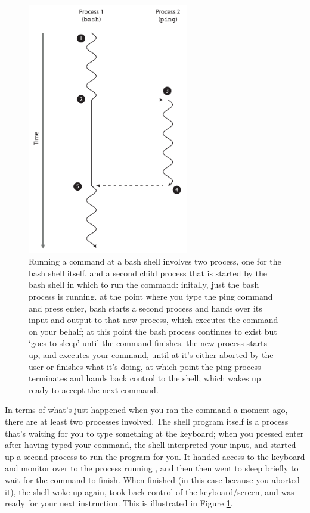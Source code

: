 \begin{figure}
\centerline{\includegraphics[width=7cm]{images/bashandping}}
\caption{Running a command at a bash shell involves two process, one for the bash shell itself, and a second child process that is started by the bash shell in which to run the command: \protect{} initally, just the bash process is running. \protect{} at the point where you type the ping command and press enter, bash starts a second process and hands over its input and output to that new process, which executes the command on your behalf; at this point the bash process continues to exist but `goes to sleep' until the command finishes. \protect{} the new process starts up, and executes your command, until at \protect{} it's either aborted by the user or finishes what it's doing, at which point \protect{} the ping process terminates and hands back control to the shell, which wakes up ready to accept the next command.}\label{figure:bashandping}
\label{fig:bashandping}
\end{figure}

In terms of what's just happened when you ran the  command a
moment ago, there are at least two processes involved. The shell
program itself is a process that's waiting for you to type something
at the keyboard; when you pressed enter after having typed your
command, the shell interpreted your input, and started up a second
process to run the  program for you. It handed 
access to the keyboard and monitor over to the process running ,
and then then went to sleep briefly to wait for the  command to
finish. When  finished (in this case because you aborted it), the
shell woke up again, took back control of the keyboard/screen, and was
ready for your next instruction. This is illustrated in Figure
\ref{fig:bashandping}.


